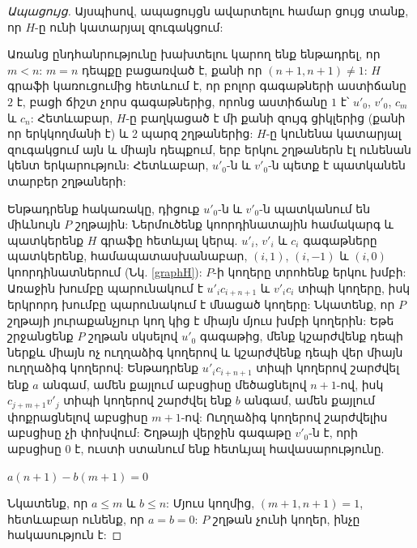 \begin{hide}
\begin{proof}[Ապացույց]
Այսպիսով, ապացույցն ավարտելու համար ցույց տանք, որ $H$-ը ունի կատարյալ զուգակցում:

Առանց ընդհանրությունը խախտելու կարող ենք ենթադրել, որ $m<n$: $m=n$ դեպքը բացառված է, քանի որ $(n+1,n+1) \not= 1$: $H$ գրաֆի կառուցումից հետևում է, որ բոլոր գագաթների աստիճանը $2$ է, բացի ճիշտ չորս գագաթներից, որոնց աստիճանը $1$ է՝ $u'_0$, $v'_0$, $c_m$ և $c_n$: Հետևաբար, $H$-ը բաղկացած է մի քանի զույգ ցիկլերից (քանի որ երկկողմանի է) և 2 պարզ շղթաներից: $H$-ը կունենա կատարյալ զուգակցում այն և միայն դեպքում, երբ երկու շղթաներն էլ ունենան կենտ երկարություն: Հետևաբար, $u'_0$-ն և $v'_0$-ն պետք է պատկանեն տարբեր շղթաների:

Ենթադրենք հակառակը, դիցուք $u'_0$-ն և $v'_0$-ն պատկանում են միևնույն $P$ շղթային:
Ներմուծենք կոորդինատային համակարգ և պատկերենք $H$ գրաֆը հետևյալ կերպ.
$u'_i$, $v'_i$ և $c_i$ գագաթները պատկերենք, համապատասխանաբար, $(i, 1)$, $(i, -1)$ և
$(i, 0)$ կոորդինատներում (Նկ. \ref{graphH}): $P$-ի կողերը տրոհենք երկու խմբի: 
Առաջին խումբը պարունակում է $u'_ic_{i+n+1}$ և $v'_ic_i$ տիպի կողերը, իսկ երկրորդ խումբը պարունակում է մնացած կողերը: Նկատենք, որ $P$ շղթայի յուրաքանչյուր կող կից է միայն մյուս խմբի կողերին:
Եթե շրջանցենք $P$ շղթան սկսելով $u'_0$ գագաթից, մենք կշարժվենք դեպի ներքև միայն ոչ ուղղաձիգ կողերով և կշարժվենք դեպի վեր միայն ուղղաձիգ կողերով: Ենթադրենք 
$u'_ic_{i+n+1}$ տիպի կողերով շարժվել ենք $a$ անգամ, ամեն քայլում աբսցիսը մեծացնելով $n+1$-ով, իսկ
$c_{j+m+1}v'_j$ տիպի կողերով շարժվել ենք $b$ անգամ, ամեն քայլում փոքրացնելով աբսցիսը $m+1$-ով: Ուղղաձիգ կողերով շարժվելիս աբսցիսը չի փոխվում:
Շղթայի վերջին գագաթը $v'_0$-ն է, որի աբսցիսը $0$ է, ուստի ստանում ենք հետևյալ հավասարությունը.
\begin{center}
$a(n+1) - b(m+1) = 0$
\end{center}
Նկատենք, որ $a\leq m$ և $b \leq n$: Մյուս կողմից, $(m+1, n+1)=1$, հետևաբար ունենք, որ
$a=b=0$: $P$ շղթան չունի կողեր, ինչը հակասություն է:
\end{proof}
\end{hide}

